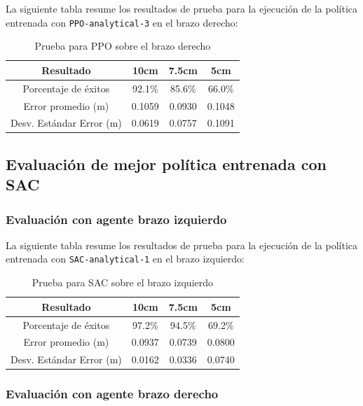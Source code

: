 La siguiente tabla resume los resultados de prueba para la ejecución de la política entrenada con \texttt{PPO-analytical-3} en el brazo derecho:

\begin{table}[h!]
	\centering
	\caption{Prueba para PPO sobre el brazo derecho}
	\label{tab:best-ppo-right}
	\begin{tabular}{|c|c|c|c|}
		\hline
		\textbf{Resultado} & \textbf{10cm} & \textbf{7.5cm} & \textbf{5cm} \\
		\hline
		Porcentaje de éxitos & 92.1\% & 85.6\% & 66.0\% \\
		\hline
		Error promedio (m) & 0.1059 & 0.0930 & 0.1048 \\
		\hline
		Desv. Estándar Error (m) & 0.0619 & 0.0757 & 0.1091\\
		\hline
	\end{tabular}
\end{table}

\subsection{Evaluación de mejor política entrenada con SAC}

\subsubsection{Evaluación con agente brazo izquierdo}

La siguiente tabla resume los resultados de prueba para la ejecución de la política entrenada con \texttt{SAC-analytical-1} en el brazo izquierdo:

\begin{table}[h!]
	\centering
	\caption{Prueba para SAC sobre el brazo izquierdo}
	\label{tab:best-sac-left}
	\begin{tabular}{|c|c|c|c|}
		\hline
		\textbf{Resultado} & \textbf{10cm} & \textbf{7.5cm} & \textbf{5cm} \\
		\hline
		Porcentaje de éxitos & 97.2\% & 94.5\% & 69.2\% \\
		\hline
		Error promedio (m) & 0.0937 & 0.0739 & 0.0800 \\
		\hline
		Desv. Estándar Error (m) & 0.0162 & 0.0336 & 0.0740 \\
		\hline
	\end{tabular}
\end{table}

\subsubsection{Evaluación con agente brazo derecho}

